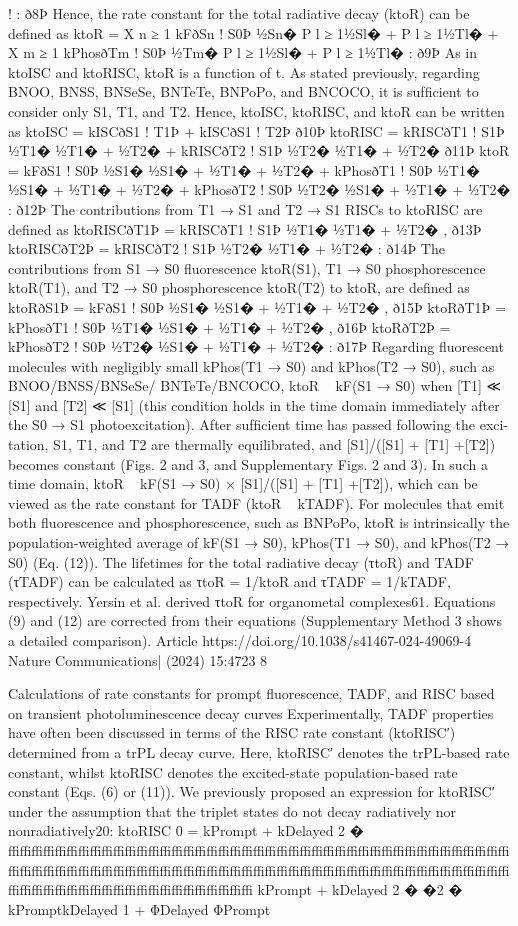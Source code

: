 !
:
ð8Þ
Hence, the rate constant for the total radiative decay (ktoR) can be
deﬁned as
ktoR =
X
n ≥ 1
kFðSn ! S0Þ
½Sn�
P
l ≥ 1½Sl� + P
l ≥ 1½Tl�
+
X
m ≥ 1
kPhosðTm ! S0Þ
½Tm�
P
l ≥ 1½Sl� + P
l ≥ 1½Tl� :
ð9Þ
As in ktoISC and ktoRISC, ktoR is a function of t.
As stated previously, regarding BNOO, BNSS, BNSeSe, BNTeTe,
BNPoPo, and BNCOCO, it is sufﬁcient to consider only S1, T1, and T2.
Hence, ktoISC, ktoRISC, and ktoR can be written as
ktoISC = kISCðS1 ! T1Þ + kISCðS1 ! T2Þ
ð10Þ
ktoRISC = kRISCðT1 ! S1Þ
½T1�
½T1� + ½T2� + kRISCðT2 ! S1Þ
½T2�
½T1� + ½T2�
ð11Þ
ktoR = kFðS1 ! S0Þ
½S1�
½S1� + ½T1� + ½T2� + kPhosðT1 ! S0Þ
½T1�
½S1� + ½T1� + ½T2�
+ kPhosðT2 ! S0Þ
½T2�
½S1� + ½T1� + ½T2� :
ð12Þ
The contributions from T1 → S1 and T2 → S1 RISCs to ktoRISC are
deﬁned as
ktoRISCðT1Þ = kRISCðT1 ! S1Þ
½T1�
½T1� + ½T2� ,
ð13Þ
ktoRISCðT2Þ = kRISCðT2 ! S1Þ
½T2�
½T1� + ½T2� :
ð14Þ
The contributions from S1 → S0 ﬂuorescence ktoR(S1), T1 → S0
phosphorescence ktoR(T1), and T2 → S0 phosphorescence ktoR(T2) to
ktoR, are deﬁned as
ktoRðS1Þ = kFðS1 ! S0Þ
½S1�
½S1� + ½T1� + ½T2� ,
ð15Þ
ktoRðT1Þ = kPhosðT1 ! S0Þ
½T1�
½S1� + ½T1� + ½T2� ,
ð16Þ
ktoRðT2Þ = kPhosðT2 ! S0Þ
½T2�
½S1� + ½T1� + ½T2� :
ð17Þ
Regarding
ﬂuorescent
molecules
with
negligibly
small
kPhos(T1 → S0)
and
kPhos(T2 → S0),
such
as
BNOO/BNSS/BNSeSe/
BNTeTe/BNCOCO, ktoR ~ kF(S1 → S0) when [T1] ≪ [S1] and [T2] ≪ [S1]
(this condition holds in the time domain immediately after the S0 → S1
photoexcitation). After sufﬁcient time has passed following the exci-
tation, S1, T1, and T2 are thermally equilibrated, and [S1]/([S1] + [T1]
+[T2])
becomes
constant
(Figs.
2
and
3,
and
Supplementary
Figs. 2 and 3). In such a time domain, ktoR ~ kF(S1 → S0) × [S1]/([S1] + [T1]
+[T2]), which can be viewed as the rate constant for TADF (ktoR ~ kTADF).
For molecules that emit both ﬂuorescence and phosphorescence, such
as BNPoPo, ktoR is intrinsically the population-weighted average of
kF(S1 → S0), kPhos(T1 → S0), and kPhos(T2 → S0) (Eq. (12)). The lifetimes for
the total radiative decay (τtoR) and TADF (τTADF) can be calculated as
τtoR = 1/ktoR and τTADF = 1/kTADF, respectively. Yersin et al. derived τtoR
for organometal complexes61. Equations (9) and (12) are corrected
from their equations (Supplementary Method 3 shows a detailed
comparison).
Article
https://doi.org/10.1038/s41467-024-49069-4
Nature Communications|        (2024) 15:4723 
8


Calculations of rate constants for prompt ﬂuorescence, TADF,
and RISC based on transient photoluminescence decay curves
Experimentally, TADF properties have often been discussed in terms of
the RISC rate constant (ktoRISC′) determined from a trPL decay curve.
Here, ktoRISC′ denotes the trPL-based rate constant, whilst ktoRISC denotes
the excited-state population-based rate constant (Eqs. (6) or (11)). We
previously proposed an expression for ktoRISC′ under the assumption
that the triplet states do not decay radiatively nor nonradiatively20:
ktoRISC
0 = kPrompt + kDelayed
2
�
ﬃﬃﬃﬃﬃﬃﬃﬃﬃﬃﬃﬃﬃﬃﬃﬃﬃﬃﬃﬃﬃﬃﬃﬃﬃﬃﬃﬃﬃﬃﬃﬃﬃﬃﬃﬃﬃﬃﬃﬃﬃﬃﬃﬃﬃﬃﬃﬃﬃﬃﬃﬃﬃﬃﬃﬃﬃﬃﬃﬃﬃﬃﬃﬃﬃﬃﬃﬃﬃﬃﬃﬃﬃﬃﬃﬃﬃﬃﬃﬃﬃﬃﬃﬃﬃﬃﬃﬃﬃﬃﬃﬃﬃﬃﬃﬃﬃﬃﬃﬃﬃﬃﬃﬃﬃﬃﬃ
kPrompt + kDelayed
2
�
�2
� kPromptkDelayed
1 + ΦDelayed
ΦPrompt
 
